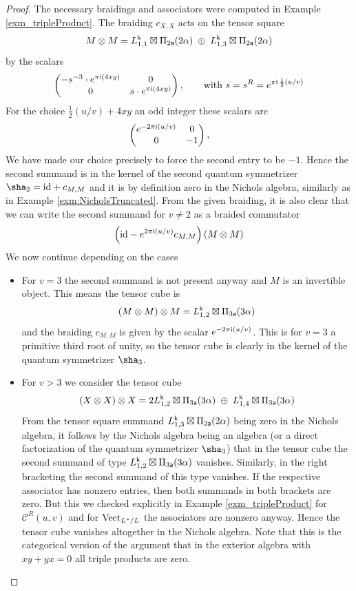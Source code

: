 \documentclass[a4paper, reqno]{amsart}
\theoremstyle{introTheorems}
\newcommand\cC{\mathcal{C}}
\newcommand\id{\textup{id}}
\newcommand{\Vect}{\textup{Vect}}
\renewcommand{\1}{\mathbbold{1}}
\begin{document}
\begin{proof}
The necessary braidings and associators were computed in Example \ref{exm_tripleProduct}.
The braiding $c_{X,X}$ acts on the tensor square
\[M\otimes M= 
L^{\mathsf{k}}_{1,1}\boxtimes\Pi_{2\mathsf{a}}(2\alpha)
\; \oplus \;
L^{\mathsf{k}}_{1,3}\boxtimes\Pi_{2\mathsf{a}}(2\alpha)
\]
by the scalars 
\[
\begin{pmatrix}
    -s^{-3}\cdot e^{\pi\mathrm{i}(4xy)}
    &
    0
    \\
    0 
    &
    s\cdot e^{\pi\mathrm{i}(4xy)}
\end{pmatrix},\qquad
\text{with }s=s^R=e^{\pi\mathrm{i}\,\frac{1}{2}(u/v)}
\]
For the choice $\frac{1}{2}(u/v)+4xy$ an odd integer these scalars are
\[
\begin{pmatrix}
    e^{-2\pi\mathrm{i}(u/v)}    
    &
    0
    \\
    0 
    &
    -1
\end{pmatrix},\qquad
\]
We have made our choice precisely to force the second entry to be $-1$. Hence the second summand is in the kernel of the second quantum symmetrizer $\sha_2=\id+c_{M,M}$ and it is by definition zero in the Nichols algebra, similarly as in Example \ref{exm:NicholsTruncated}.
From the given braiding, it is also clear that  we can write the second summand for $v\neq 2$ as a braided commutator 
\[\left(\id-e^{2\pi\i(u/v)}c_{M,M}\right)(M\otimes M)\]
We now continue depending on the cases
\begin{itemize}
\item 
For $v=3$ the second summand is not present anyway and $M$ is an invertible object. This means the tensor cube is
\[(M\otimes M)\otimes M= 
L^{\mathsf{k}}_{1,2} \boxtimes \Pi_{3\mathsf{a}}(3\alpha)
\]
and the braiding $c_{M,M}$ is given by the scalar $e^{-2\pi\mathrm{i}(u/v)}$. This is for $v=3$ a primitive third root of unity, so the tensor cube is  clearly in the kernel of the quantum symmetrizer $\sha_3$.
\item 
For $v>3$ we consider the tensor cube
\[(X\otimes X)\otimes X= 
2L^{\mathsf{k}}_{1,2} \boxtimes\Pi_{3\mathsf{a}}(3\alpha)
\; \oplus \;
L^{\mathsf{k}}_{1,4}\boxtimes\Pi_{3\mathsf{a}}(3\alpha)
\]
From the tensor square summand $L^{\mathsf{k}}_{1,3}\boxtimes\Pi_{2\mathsf{a}}(2\alpha)$ being zero in the Nichols algebra, it follows by the Nichols algebra being an algebra (or a direct factorization of the quantum symmetrizer $\sha_3$) that in the tensor cube the second summand of type $L^{\mathsf{k}}_{1,2}\boxtimes\Pi_{3\mathsf{a}}(3\alpha)$ vanishes. Similarly, in the right bracketing the second summand of this type vanishes. If the respective associator has nonzero entries, then both summands in both brackets are zero. But this we checked explicitly in Example \ref{exm_tripleProduct} for $\cC^R(u,v)$ and for $\Vect_{L^*/L}$ the associators are nonzero anyway. Hence the tensor cube vanishes altogether in the Nichols algebra. Note that this is the categorical version of the argument that in the exterior algebra with $xy+yx=0$ all triple products are zero.  

\end{itemize}
\end{proof}
\end{document}
